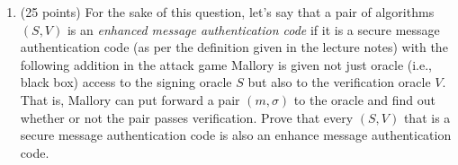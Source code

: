 \documentclass{article}
\begin{document}
\begin{enumerate}[,start=4]
\begin{enumerate}[noitemsep,topsep=\mdcompacttopsep,label=\alph*.]
\begin{mdbmarginx}{1ex}{0pt}{1ex}{0pt}
random function, then $x_2 = y_1$ with probability $\frac{1}{2}$. Therefore:%
\end{mdbmarginx}%
\noindent\noindent\[%
|\E_{s \gets \zo^{|s|}}[A^{f^2_s(\cdot)}(1^{|s|})] - \E_{H \gets [2^{|s|}] \to \zo^2}[A^H(1^{|s|})] | = |1 - \frac{1}{2}| = \frac{1}{2}
\]%
which is non-negligible. Furthermore, note that $A$ makes simply two queries to its black box
and compares two bits, which implies it is therefore computationally efficient.%
\end{enumerate}%

\item{}
(25 points) For the sake of this question, let's say that a pair of algorithms $(S,V)$ is an \emph{enhanced message authentication code} if it is a secure message authentication code (as per the definition given in the lecture notes) with the following addition\textemdash{} in the attack game Mallory is given not just oracle (i.e., black box) access to the signing oracle $S$ but also to the verification oracle $V$. That is, Mallory can put forward a pair $(m,\sigma)$ to the oracle and find out whether or not the pair passes verification. Prove that every $(S,V)$ that is a secure message authentication code is also an enhance message authentication code.%


\end{enumerate}
\end{document}
